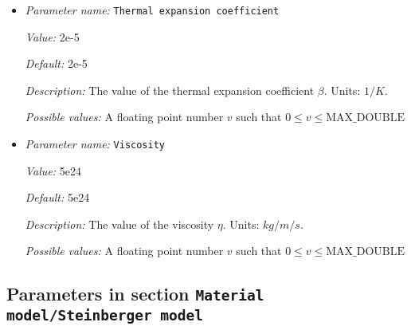 \begin{itemize}
{\it Value:} 4.7


{\it Default:} 4.7


{\it Description:} The value of the thermal conductivity $k$. Units: $W/m/K$.


{\it Possible values:} A floating point number $v$ such that $0 \leq v \leq \text{MAX\_DOUBLE}$
\item {\it Parameter name:} {\tt Thermal expansion coefficient}
\label{parameters:Material model/Simpler model/Thermal expansion coefficient}
\label{parameters:Material_20model/Simpler_20model/Thermal_20expansion_20coefficient}


{\it Value:} 2e-5


{\it Default:} 2e-5


{\it Description:} The value of the thermal expansion coefficient $\beta$. Units: $1/K$.


{\it Possible values:} A floating point number $v$ such that $0 \leq v \leq \text{MAX\_DOUBLE}$
\item {\it Parameter name:} {\tt Viscosity}
\label{parameters:Material model/Simpler model/Viscosity}
\label{parameters:Material_20model/Simpler_20model/Viscosity}


{\it Value:} 5e24


{\it Default:} 5e24


{\it Description:} The value of the viscosity $\eta$. Units: $kg/m/s$.


{\it Possible values:} A floating point number $v$ such that $0 \leq v \leq \text{MAX\_DOUBLE}$
\end{itemize}

\subsection{Parameters in section \tt Material model/Steinberger model}
\label{parameters:Material_20model/Steinberger_20model}

